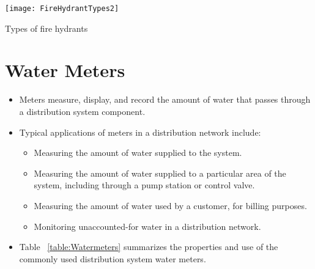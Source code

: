 \begin{table}[H]
\begin{center}
        \texttt{[image: FireHydrantTypes2]}
        \caption{Types of fire hydrants}
\end{center}
\end{table}

\section{Water Meters}
\begin{itemize}
\item \begin{singlespacing}Meters measure, display, and record the amount of water that passes through a distribution system component. \end{singlespacing}

\item Typical applications of meters in a distribution network include:

\begin{itemize}
\item Measuring the amount of water supplied to the system.

\item Measuring the amount of water supplied to a particular area of the system, including through a pump station or control valve.

\item Measuring the amount of water used by a customer, for billing purposes.

\item Monitoring unaccounted-for water in a distribution network.\\

\end{itemize}
\item Table ~\ref{table:Watermeters} summarizes the properties and use of the commonly used distribution system water meters.
\end{itemize}
\vspace{-0.5em}
\newpage

